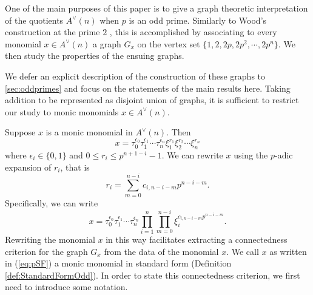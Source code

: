 \documentclass{amsart}
\theoremstyle{definition}
\newtheorem{deff}[theorem]{Definition}
\theoremstyle{plain}
\numberwithin{theorem}{section}
\numberwithin{equation}{section}
\numberwithin{figure}{section}
\newcommand{\0}{\langle 0 \rangle }
\begin{document}
One of the main purposes of this paper is to give a graph theoretic interpretation of the quotients $A^\vee (n)$ when $p$ is an odd prime. Similarly to Wood's construction at the prime $2$ \cite[]{Wood98}, this is accomplished by associating to every monomial $x \in A^\vee (n)$ a graph $G_x$ on the vertex set $\{1, 2, 2p, 2p^2, \cdots, 2p^n \}$. We then study the properties of the ensuing graphs. 

We defer an explicit description of the construction of these graphs to \cref{sec:oddprimes} and focus on the statements of the main results here. Taking addition to be represented as disjoint union of graphs, it is sufficient to restrict our study to monic monomials $x \in A^\vee (n)$.

Suppose $x$ is a monic monomial in $A^\vee (n)$. Then
\[
x = \tau_0^{\epsilon_0} \tau_1^{\epsilon_1} \cdots \tau_n^{\epsilon_n} \xi_1^{r_1} \xi_2^{r_2} \cdots \xi_n^{r_n}
\]
where $\epsilon_i \in \{0,1\}$ and $0 \leq r_i \leq p^{n + 1 - i} - 1$. We can rewrite $x$ using the $p$-adic expansion of $r_i$, that is
\[
r_i = \sum_{m=0}^{n-i} c_{i, n-i-m} p^{n-i-m}.
\]
Specifically, we can write
\begin{equation} \label{eq:pSF}
x = \tau_0^{\epsilon_0} \tau_1^{\epsilon_1} \cdots \tau_n^{\epsilon_n} \prod_{i=1}^n \prod_{m=0}^{n-i} \xi_i^{c_{i,n-i-m}p^{n-i-m}}.
\end{equation}
Rewriting the monomial $x$ in this way facilitates extracting a connectedness criterion for the graph $G_x$ from the data of the monomial $x$. We call $x$ as written in (\ref{eq:pSF}) a monic monomial in standard form (Definition \ref{def:StandardFormOdd}). In order to state this connectedness criterion, we first need to introduce some notation.

\end{document}
